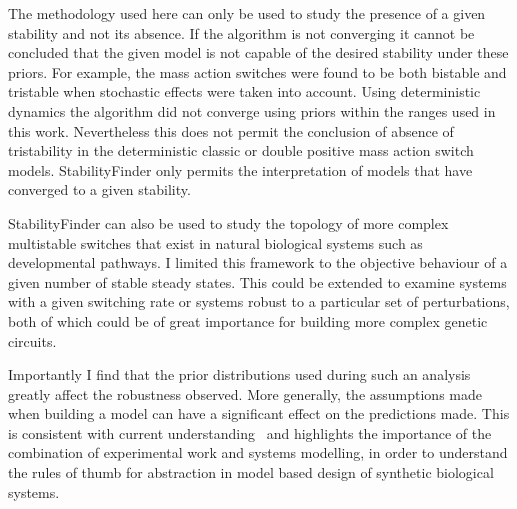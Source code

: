 
The methodology used here can only be used to study the presence of a given stability and not its absence. If the algorithm is not converging it cannot be concluded that the given model is not capable of the desired stability under these priors. For example, the mass action switches were found to be both bistable and tristable when stochastic effects were taken into account. Using deterministic dynamics the algorithm did not converge using priors within the ranges used in this work. Nevertheless this does not permit the conclusion of absence of tristability in the deterministic classic or double positive mass action switch models. StabilityFinder only permits the interpretation of models that have converged to a given stability. 




StabilityFinder can also be used to study the topology of more complex multistable switches that exist in natural biological systems such as developmental pathways. I limited this framework to the objective behaviour of a given number of stable steady states. This could be extended to examine systems with a given switching rate or systems robust to a particular set of perturbations, both of which could be of great importance for building more complex genetic circuits.

Importantly I find that the prior distributions used during such an analysis greatly affect the robustness observed. More generally, the assumptions made when building a model can have a significant effect on the predictions made. This is consistent with current understanding~\autocite{Babtie:2014jg} and highlights the importance of the combination of experimental work and systems modelling, in order to understand the rules of thumb for abstraction in model based design of synthetic biological systems.

